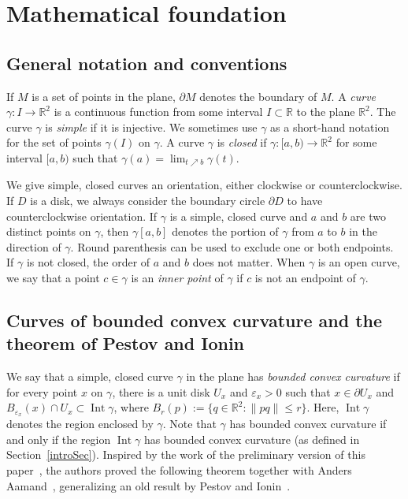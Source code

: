 \documentclass{article}
\newcommand{\RR}{\mathbb R}
\newcommand{\ee}{\varepsilon}
\newcommand{\mydef}{:=}
\DeclareMathOperator{\Int}{Int}
\begin{document}
\section{Mathematical foundation}\label{mathFound}

\subsection{General notation and conventions}

If $M$ is a set of points in the plane, $\partial M$ denotes the boundary of $M$.
A \emph{curve} $\gamma\colon I\longrightarrow\mathbb R^2$ is a continuous function from some interval $I\subset\RR$ to the plane $\RR^2$.
The curve $\gamma$ is \emph{simple} if it is injective.
We sometimes use $\gamma$ as a short-hand notation for the set of points $\gamma(I)$ on $\gamma$.
A curve $\gamma$ is \emph{closed} if $\gamma\colon [a,b)\to\RR^2$ for some interval $[a,b)$ such that
$\gamma(a)=\lim_{t\nearrow b}\gamma(t)$.

We give simple, closed curves an orientation, either clockwise or counterclockwise.
If $D$ is a disk, we always consider the boundary circle $\partial D$ to have counterclockwise orientation.
If $\gamma$ is a simple, closed curve and $a$ and $b$ are two distinct points on $\gamma$, then $\gamma[a,b]$ denotes the portion of $\gamma$ from $a$ to $b$ in the direction of $\gamma$.
Round parenthesis can be used to exclude one or both endpoints.
If $\gamma$ is not closed, the order of $a$ and $b$ does not matter.
When $\gamma$ is an open curve, we say that a point $c\in\gamma$ is an \emph{inner point} of $\gamma$ if $c$ is not an endpoint of $\gamma$.


\subsection{Curves of bounded convex curvature and the theorem of Pestov and Ionin}

We say that a simple, closed curve $\gamma$ in the plane has \emph{bounded convex curvature} if for every point $x$ on $\gamma$, there is a unit disk $U_x$ and $\ee_x>0$ such that $x\in\partial U_x$ and $B_{\ee_x}(x)\cap U_x\subset\Int\gamma$, where $B_r(p)\mydef \{q\in\RR^2\colon \|pq\|\leq r\}$.
Here, $\Int\gamma$ denotes the region enclosed by $\gamma$.
Note that $\gamma$ has bounded convex curvature if and only if the region $\Int\gamma$ has bounded convex curvature (as defined in Section~\ref{introSec}).
Inspired by the work of the preliminary version of this paper~\cite{abrahamsen_et_al:LIPIcs:2016:5896}, the authors proved the following theorem together with Anders Aamand~\cite{aam2019disks}, generalizing an old result by Pestov and Ionin~\cite{pestov1959largest}.
\end{document}
